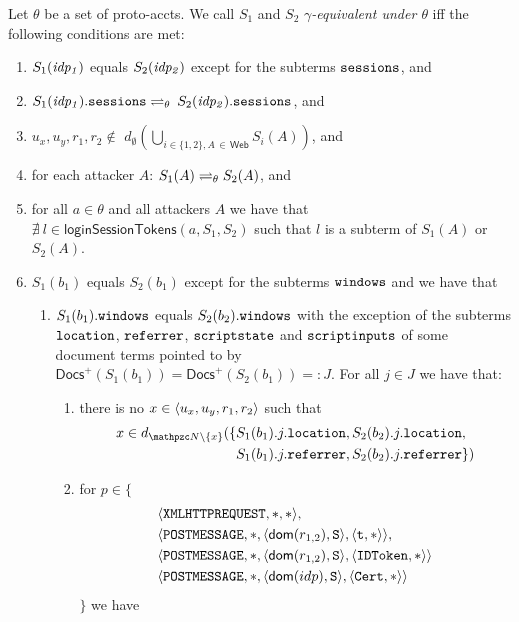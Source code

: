   \begin{definition}\label{def:rp:eq-of-states}
    Let $\theta$ be a set of proto-accts. %
    We call $S_1$ and $S_2$ \emph{$\gamma$-equivalent under 
    $\theta$} iff the following conditions are met:
    \begin{enumerate}
    \item\label{eqs:rp:idp} 
      $S_1(\mathit{idp_1})$ equals $S_2(\mathit{idp_2})$ except
      for the subterms $\mathtt{sessions}$, and
    \item\label{eqs:rp:idp-sessions} 
      $S_1(\mathit{idp_1}).\mathtt{sessions} \rightleftharpoons_{\theta}$ 
      $S_2(\mathit{idp_2}).\mathtt{sessions}$, and
    \item\label{eqs:rp:att-unknown}
      $u_x, u_y, r_1, r_2 \not\in $
      $d_\emptyset(\bigcup_{i\in\{1,2\},A\,\in\,\mathsf{Web}}S_i(A))$, and
    \item\label{eqs:rp:att} 
      for each attacker $A$:
      $S_1(A) \rightleftharpoons_{\theta} S_2(A)$, and
    \item\label{eqs:rp:att-not-l} 
      for all $a\in\theta$ and all attackers $A$ we have that
      $\nexists\ l \in \mathsf{loginSessionTokens}(a,S_1,S_2)$ 
      such that $l$ is a subterm of $S_1(A)$ or $S_2(A)$.
    \item\label{eqs:rp:b} 
      $S_1(b_1)$ equals $S_2(b_1)$ except for the subterms 
      $\mathtt{windows}$ and we have that
      \begin{enumerate}
      \item\label{eqs:rp:b:w}
        $S_1(b_1).\mathtt{windows}$ equals $S_2(b_2).\mathtt{windows}$ 
        with the exception of the subterms $\mathtt{location}$, $\mathtt{referrer}$, $\mathtt{scriptstate}$ 
        and $\mathtt{scriptinputs}$ of some document terms pointed 
        to by $\mathsf{Docs}^+(S_1(b_1)) = \mathsf{Docs}^+(S_2(b_1)) =: J$. 
        For all $j \in J$ we have that: 
        \begin{enumerate}
        \item there is no $x\in\langle {{}u_x, u_y, r_1, r_2} \rangle$ such that
          \begin{align*}
            x \in d_{\nonces \setminus \{x\}}(\{&S_1(b_1).j.\str{location}
            ,  S_2(b_2).j.\str{location},\\ & S_1(b_1).j.\str{referrer} , 
            S_2(b_2).j.\str{referrer}\})
          \end{align*}
        \item \label{eqs:rp:b:w:scriptinputs} for $p \in \{$
          \begin{align*}
            & \langle\mathtt{XMLHTTPREQUEST},*,*\rangle,\\
            & \langle\mathtt{POSTMESSAGE},*,\langle\mathsf{dom}(r_{1,2}), \mathtt{S}\rangle,\langle\mathtt{t}, *\rangle\rangle,\\
            & \langle\mathtt{POSTMESSAGE},*,\langle\mathsf{dom}(r_{1,2}), \mathtt{S}\rangle,\langle\mathtt{IDToken}, *\rangle\rangle\\
            & \langle\mathtt{POSTMESSAGE},*,\langle\mathsf{dom}(idp), \mathtt{S}\rangle,\langle\mathtt{Cert}, *\rangle\rangle
          \end{align*}
          $\}$ we have


\end{enumerate}
\end{enumerate}
\end{enumerate}
\end{definition}
